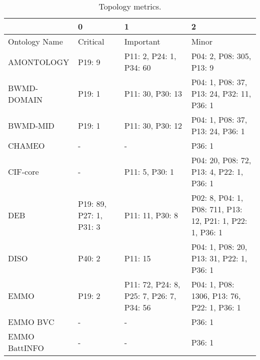 \begin{table}
\centering
\caption{Topology metrics.}
\label{tab:topology-metrics}
\begin{tabular}{m{3.5cm}m{2cm}m{2cm}m{2cm}}
\toprule
{} &                  0  &                    1  &                     2  \\
\midrule
Ontology Name &                Critical &                                                Important &                                                      Minor \\
             AMONTOLOGY &                  P19: 9 &                                  P11: 2, P24: 1, P34: 60 &                                   P04: 2, P08: 305, P13: 9 \\
            BWMD-DOMAIN &                  P19: 1 &                                         P11: 30, P30: 13 &                  P04: 1, P08: 37, P13: 24, P32: 11, P36: 1 \\
               BWMD-MID &                  P19: 1 &                                         P11: 30, P30: 12 &                           P04: 1, P08: 37, P13: 24, P36: 1 \\
                 CHAMEO &                       - &                                                        - &                                                     P36: 1 \\
               CIF-core &                       - &                                           P11: 5, P30: 1 &                   P04: 20, P08: 72, P13: 4, P22: 1, P36: 1 \\
                    DEB & P19: 89, P27: 1, P31: 3 &                                          P11: 11, P30: 8 &  P02: 8, P04: 1, P08: 711, P13: 12, P21: 1, P22: 1, P36: 1 \\
                   DISO &                  P40: 2 &                                                  P11: 15 &                   P04: 1, P08: 20, P13: 31, P22: 1, P36: 1 \\
                   EMMO &                  P19: 2 &                 P11: 72, P24: 8, P25: 7, P26: 7, P34: 56 &                 P04: 1, P08: 1306, P13: 76, P22: 1, P36: 1 \\
               EMMO BVC &                       - &                                                        - &                                                     P36: 1 \\
          EMMO BattINFO &                       - &                                                        - &                                                     P36: 1 \\

\end{tabular}
\end{table}
